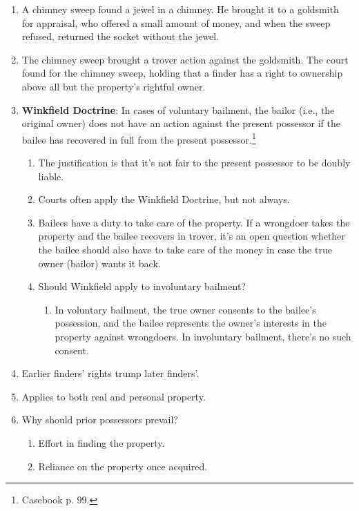 \begin{enumerate}
    \item A chimney sweep found a jewel in a chimney. He brought it to a 
    goldsmith for appraisal, who offered a small amount of money, and when the 
    sweep refused, returned the socket without the jewel.
    \item The chimney sweep brought a trover action against the goldsmith. The 
    court found for the chimney sweep, holding that a finder has a right to 
    ownership above all but the property's rightful owner.
    \item \textbf{Winkfield Doctrine}: In cases of voluntary bailment, the 
    bailor (i.e., the original owner) does not have an action against the 
    present possessor if the bailee has recovered in full from the present 
    possessor.\footnote{Casebook p. 99.}
    \begin{enumerate}
        \item The justification is that it's not fair to the present 
        possessor to be doubly liable.
        \item Courts often apply the Winkfield Doctrine, but not always.
        \item Bailees have a duty to take care of the property. If a wrongdoer 
        takes the property and the bailee recovers in trover, it's an open 
        question whether the bailee should also have to take care of the money 
        in case the true owner (bailor) wants it back.
        \item Should Winkfield apply to involuntary bailment?
        \begin{enumerate}
            \item In voluntary bailment, the true owner consents to the 
            bailee's possession, and the bailee represents the owner's 
            interests in the property against wrongdoers. In involuntary 
            bailment, there's no such consent.
        \end{enumerate}
    \end{enumerate}
    \item Earlier finders' rights trump later finders'.
    \item Applies to both real and personal property.
    \item Why should prior possessors prevail?
    \begin{enumerate}
        \item Effort in finding the property.
        \item Reliance on the property once acquired.

\end{enumerate}
\end{enumerate}
